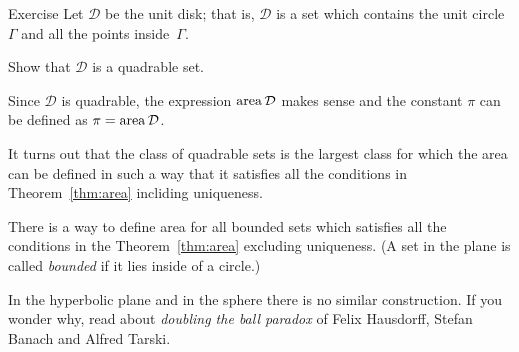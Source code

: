 \begin{thm}{Exercise}\label{ex:circle-is-quadrable}
Let $\mathcal{D}$ be the unit disk;
that is, $\mathcal{D}$ is a set which contains 
the unit circle $\Gamma$ and all the points inside~$\Gamma$.

Show that $\mathcal{D}$ is a quadrable set.
\end{thm}

Since $\mathcal{D}$ is quadrable, the expression $\mathop{\rm area}\nolimits\mathcal{D}$ makes sense and the constant $\pi$ can be defined as $\pi=\mathop{\rm area}\nolimits\mathcal{D}$.

\medskip

It turns out that the class of quadrable sets is the largest class for which 
the area can be defined in such a way that it satisfies all the conditions in Theorem~\ref{thm:area} incliding uniqueness.

There is a way to define area for all bounded sets
which satisfies all the conditions in the Theorem~\ref{thm:area} excluding uniqueness.
(A set in the plane is called \emph{bounded} if it lies inside of a circle.)

In the hyperbolic plane and in the sphere
there is no similar construction.
If you wonder why,
read about \emph{doubling the ball paradox} of Felix Hausdorff, Stefan Banach and Alfred Tarski.


